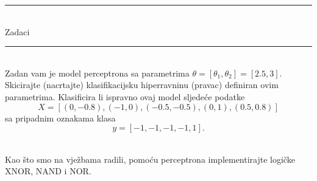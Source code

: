 \documentclass{../../OM_style}
\begin{document}
\setcounter{chapter}{1}
\pagestyle{OM_lecture}


\begin{center}
\rule{10cm}{0.3pt}\\
\bigskip
{\LARGE Zadaci}\\
\rule{10cm}{0.3pt}
\end{center}




\begin{zadatak} \hfill \\
Zadan vam je model perceptrona sa parametrima $\theta =[\theta_1 ,\theta_2]= [2.5, 3]$. \\
Skicirajte (nacrtajte) klasifikacijsku hiperravninu (pravac) definiran ovim parametrima. Klasificira li ispravno ovaj model sljedeće podatke
$$X= [(0,-0.8), (-1,0), (-0.5, -0.5), (0,1), (0.5,0.8)]$$
sa pripadnim oznakama klasa 
$$y = [-1,-1,-1,-1,1]. $$
\end{zadatak}

\begin{zadatak} \hfill \\
Kao što smo na vježbama radili, pomoću perceptrona implementirajte logičke XNOR, NAND i NOR. 
\end{zadatak}
\end{document}

